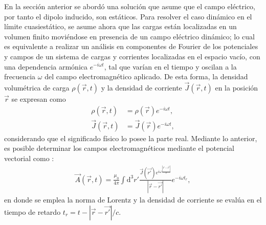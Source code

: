 En la sección anterior se abordó una solución que asume que el campo eléctrico,  por tanto el dipolo inducido, son estáticos. Para resolver el caso dinámico en el límite cuasiestático, se asume ahora que las cargas están localizadas en un volumen finito moviéndose en presencia de un campo eléctrico dinámico; lo cual es equivalente a realizar un análisis en componentes de Fourier de los potenciales y campos de un sistema de cargas y corrientes localizadas en el espacio vacío, con una dependencia armónica $e^{-i\omega t}$, tal que varían en el tiempo y oscilan a la frecuencia $\omega$ del campo electromagnético aplicado. De esta forma, la densidad volumétrica de carga $\rho(\Vec{r},t)$ y la densidad de corriente $\Vec{J}(\Vec{r},t)$  en la posición $\Vec{r}$ se expresan como \cite{Jackson}
\begin{align}
    \rho(\Vec{r},t)&=\rho(\Vec{r})e^{-i\omega t},\nonumber\\
    \Vec{J}(\Vec{r},t)&=\Vec{J}(\Vec{r})e^{-i\omega t},
    \label{armonicf}
\end{align}
considerando que el significado físico lo posee la parte real. Mediante lo anterior, es posible determinar los campos electromagnéticos mediante el potencial vectorial como \cite{Jackson}:
\begin{align}
  \Vec{A}(\Vec{r},t)=\frac{\mu_0}{4\pi}\int \text{d}^3r'\frac{\Vec{J}(\Vec{r'})e^{i\omega \frac{|\Vec{r}-\Vec{r'}|}{c}}}{|\Vec{r}-\Vec{r'}|}e^{-i\omega t_r},
  \label{Achafa}
\end{align}
en donde se emplea la norma de Lorentz \cite{Griffiths} y la densidad de corriente se evalúa en el tiempo de retardo $t_r=t-|\Vec{r}-\Vec{r'}|/c$. \\

